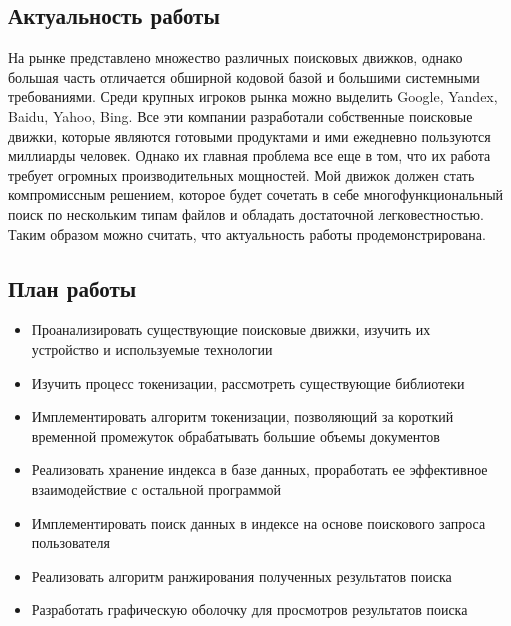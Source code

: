 \subsection{Актуальность работы}
На рынке представлено множество различных поисковых движков, однако большая часть отличается обширной кодовой базой и 
большими системными требованиями. Среди крупных игроков рынка можно выделить Google, Yandex, Baidu, Yahoo, Bing. 
Все эти компании разработали собственные поисковые движки, которые являются готовыми продуктами и ими ежедневно пользуются 
миллиарды человек. Однако их главная  проблема все еще в том, что их работа требует огромных производительных 
мощностей. Мой движок должен стать компромиссным решением, которое будет сочетать в себе многофункциональный поиск 
по нескольким типам файлов и обладать достаточной легковестностью. Таким образом можно считать, 
что актуальность работы продемонстрирована.

\subsection{План работы}
\begin{itemize}
    \item{Проанализировать существующие поисковые движки, изучить их \\
    устройство и используемые технологии}
    \item {Изучить процесс токенизации, рассмотреть существующие библиотеки}
    \item {Имплементировать алгоритм токенизации, позволяющий за короткий временной промежуток обрабатывать большие объемы документов}
    \item {Реализовать хранение индекса в базе данных, проработать ее эффективное взаимодействие с остальной программой}
    \item {Имплементировать поиск данных в индексе на основе поискового запроса пользователя }
    \item {Реализовать алгоритм ранжирования полученных результатов поиска}
    \item {Разработать графическую оболочку для просмотров результатов поиска}
  \end{itemize}